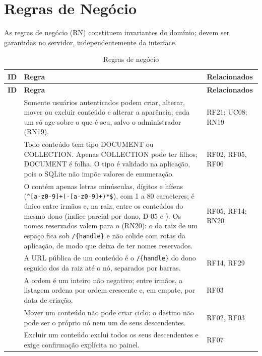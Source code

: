 \section{Regras de Negócio}\label{sec:regras-negocio}

As regras de negócio (RN) constituem invariantes do domínio; devem ser garantidas no servidor, independentemente da interface.

\begin{longtable}{@{}L{1.3cm}L{9.6cm}L{2.8cm}@{}}
\caption{Regras de negócio}\label{tab:rn}\\
\toprule
\textbf{ID} & \textbf{Regra} & \textbf{Relacionados}\\
\midrule
\endfirsthead
\toprule
\textbf{ID} & \textbf{Regra} & \textbf{Relacionados}\\
\midrule
\endhead
\bottomrule
\endfoot
{} & Somente usuários autenticados podem criar, alterar, mover ou excluir conteúdo e alterar a aparência; cada um só age sobre o que é seu, salvo o administrador (RN19). & RF21; UC08; RN19\\[1pt]
 & Todo conteúdo tem tipo DOCUMENT ou COLLECTION. Apenas COLLECTION pode ter filhos; DOCUMENT é folha. O tipo é validado na aplicação, pois o SQLite não impõe valores de enumeração. & RF02, RF05, RF06\\[1pt]
 & O  contém apenas letras minúsculas, dígitos e hífens (\texttt{\^{}[a-z0-9]+(-[a-z0-9]+)*\$}), com 1 a 80 caracteres; é único entre irmãos e, na raiz, entre os conteúdos do mesmo dono (índice parcial por dono, D-05 e ). Os nomes reservados valem para o  (RN20): o  da raiz de um espaço fica sob \texttt{/\{handle\}} e não colide com rotas da aplicação, de modo que deixa de ter nomes reservados. & RF05, RF14; RN20\\[1pt]
 & A URL pública de um conteúdo é o \texttt{/\{handle\}} do dono seguido dos  da raiz até o nó, separados por barras. & RF14, RF29\\[1pt]
 & A ordem é um inteiro não negativo; entre irmãos, a listagem ordena por ordem crescente e, em empate, por data de criação. & RF03\\[1pt]
 & Mover um conteúdo não pode criar ciclo: o destino não pode ser o próprio nó nem um de seus descendentes. & RF02, RF03\\[1pt]
 & Excluir um conteúdo exclui todos os seus descendentes e exige confirmação explícita no painel. & RF07\\[1pt]

\end{longtable}
